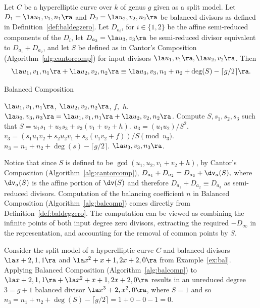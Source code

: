 \bl\label{lem:compn}
\cite[Adapted from Lemma~10.4.10]{Galbraith_PKC_2012} Let $C$ be a hyperelliptic
curve over $k$ of genus $g$ given as a split model. Let $D_1 = \la  u_1,v_1,n_1 \ra$
and $D_2 = \la u_2,v_2,n_2 \ra$ be balanced divisors as defined in
Definition~\ref{def:baldegzero}. Let $D_{a_i}$, for $i \in \{1,2\}$ be the
affine semi-reduced components of the $D_i$, let $D_{a_3} = \la u_3,v_3 \ra$ be
semi-reduced divisor equivalent to $D_{a_1} + D_{a_2}$, and let $S$ be defined
as in Cantor's Composition (Algorithm~\ref{alg:cantorcomp}) for input divisors
$\la u_1,v_1 \ra,\la u_2,v_2 \ra$. Then $$\la u_1,v_1,n_1 \ra + \la u_2,v_2,n_2
\ra \equiv \la u_3,v_3, n_1 + n_2 + \deg(S)- \lceil g/2 \rceil \ra.$$
\el

\begin{algorithm}[ht]
  \caption{Balanced Composition}
  \label{alg:balcomp}
  {\fontsize{12}{18}\selectfont
  \begin{algorithmic}[1]
  \Require $\la u_1,v_1,n_1 \ra$, $\la u_2,v_2,n_2 \ra$, $f,$ $h.$
  \Ensure $\la u_3,v_3, n_3 \ra = \la u_1,v_1,n_1 \ra + \la u_2,v_2,n_2 \ra$.
  \vspace{5pt}
  \State Compute $S,s_1,s_2,s_3$ such that $S = u_1s_1 + u_2s_3 + s_3(v_1 + v_2
  + h)$. 
  \State $u_3 = (u_1u_2)/S^2$. \State $v_3 = (s_1u_1v_2 + s_2u_2v_1 +
  s_3(v_1v_2 + f))/S \pmod{u_3}$. \State $n_3 = n_1 + n_2  + \deg(s) - \lceil
  g/2 \rceil$. 
  \State \Return $\la u_3,v_3,n_3 \ra$.
  \end{algorithmic}
  }
\end{algorithm}

Notice that since $S$ is defined to be $\gcd(u_1,u_2,v_1+v_2+h)$, by Cantor's
Composition (Algorithm~\ref{alg:cantorcomp}),  $D_{a_1} + D_{a_2} = D_{a_3} +
\dv_a(S),$ where $\dv_a(S)$ is the affine portion of $\dv(S)$ and therefore
$D_{a_1} + D_{a_2} \equiv D_{a_3}$ as semi-reduced divisors. Computation of the
balancing coefficient $n$ in Balanced Composition (Algorithm~\ref{alg:balcomp})
comes directly from Definition~\ref{def:baldegzero}. The computation can be
viewed as combining the infinite points of both input degree zero divisors,
extracting the required $-D_{\infty}$ in the representation, and accounting for
the removal of common points by $S$.

\be\label{ex:balunreducedgp1} Consider the split model of a hyperelliptic curve
$C$ and balanced divisors $\la x + 2,1,1 \ra$ and $\la x^2 + x + 1,2x + 2,0 \ra$
from Example~\ref{ex:bal}. Applying Balanced Composition
(Algorithm~\ref{alg:balcomp}) to $\la x + 2,1,1 \ra + \la x^2 + x + 1,2x + 2,0
\ra$ results in an unreduced degree $3 = g+1$ balanced divisor $\la x^3 + 2,
x^2, 0 \ra$, where $S = 1$ and so $n_3 = n_1 + n_2 +\deg(S) - \lceil g/2 \rceil
= 1 + 0 - 0 - 1 = 0.$
\ee

